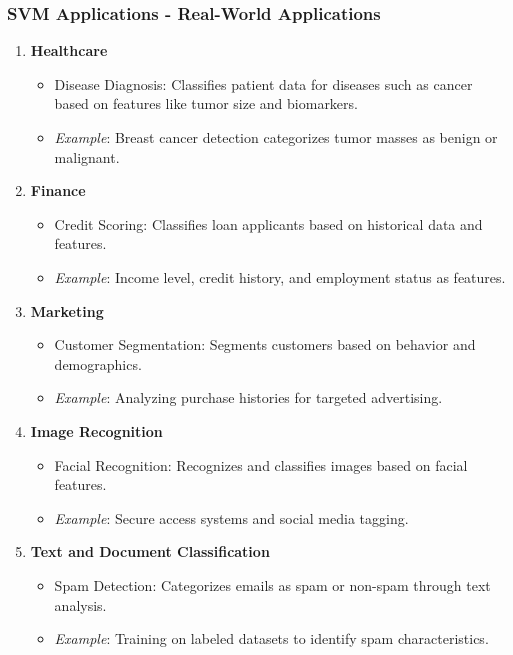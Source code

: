 \documentclass[aspectratio=169]{beamer}
\begin{document}
\begin{frame}[fragile]
    \frametitle{SVM Applications - Real-World Applications}
    \begin{enumerate}
        \item \textbf{Healthcare}
        \begin{itemize}
            \item Disease Diagnosis: Classifies patient data for diseases such as cancer based on features like tumor size and biomarkers.
            \item \textit{Example}: Breast cancer detection categorizes tumor masses as benign or malignant.
        \end{itemize}
        
        \item \textbf{Finance}
        \begin{itemize}
            \item Credit Scoring: Classifies loan applicants based on historical data and features.
            \item \textit{Example}: Income level, credit history, and employment status as features.
        \end{itemize}
        
        \item \textbf{Marketing}
        \begin{itemize}
            \item Customer Segmentation: Segments customers based on behavior and demographics.
            \item \textit{Example}: Analyzing purchase histories for targeted advertising.
        \end{itemize}
        
        \item \textbf{Image Recognition}
        \begin{itemize}
            \item Facial Recognition: Recognizes and classifies images based on facial features.
            \item \textit{Example}: Secure access systems and social media tagging.
        \end{itemize}
        
        \item \textbf{Text and Document Classification}
        \begin{itemize}
            \item Spam Detection: Categorizes emails as spam or non-spam through text analysis.
            \item \textit{Example}: Training on labeled datasets to identify spam characteristics.
        \end{itemize}
    \end{enumerate}
\end{frame}
\end{document}
